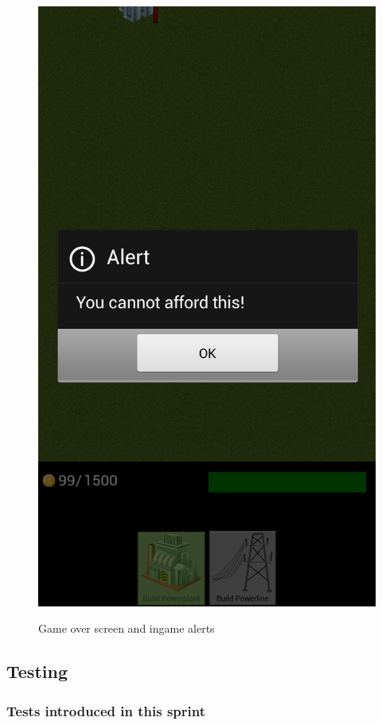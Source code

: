 \begin{figure}[H]
{		\includegraphics[scale=0.17]{pictures/sprint2-screen/sprint2-11}
	}
	\caption{Game over screen and ingame alerts}
	\end{figure}

\clearpage
\subsection{Testing}

	\subsubsection{Tests introduced in this sprint}

